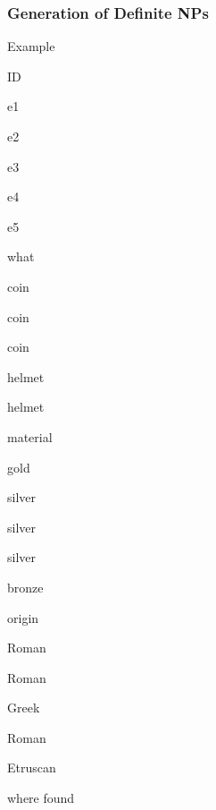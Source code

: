 \documentclass[compress,color=usenames]{beamer}
\begin{document}
\begin{frame}
\frametitle{
Generation of Deﬁnite NPs}



Example



ID



e1



e2



e3



e4



e5






what



coin



coin



coin



helmet



helmet


material



gold



silver



silver



silver



bronze






origin



Roman



Roman



Greek



Roman



Etruscan










where found




\end{frame}
\end{document}
